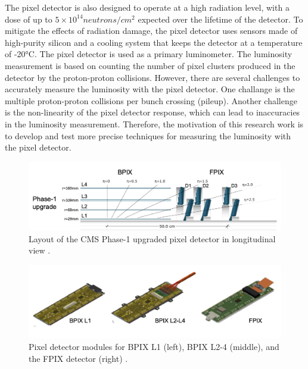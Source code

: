 The pixel detector is also designed to operate at a high radiation level, with a dose of up to $5 \times 10^{14} neutrons/cm^2$ expected over the lifetime of the detector. To mitigate the effects of radiation damage, the pixel detector uses sensors made of high-purity silicon and a cooling system that keeps the detector at a temperature of -20°C. The pixel detector is  used as a primary luminometer. The luminosity measurement is based on counting the number of pixel clusters produced in the detector by the proton-proton collisions.  However, there are several challenges to accurately measure the luminosity with the pixel detector. One challange is the multiple proton-proton collisions per bunch crossing (pileup). Another challenge is the non-linearity of the pixel detector response, which can lead to inaccuracies in the luminosity measurement. Therefore, the motivation of this research work is to develop and test more precise techniques for measuring the luminosity with the pixel detector.

\begin{figure}[!htp]
\centering
\includegraphics[width=1\textwidth]{ashish_thesis/phaseI_upgrade_pixel_detector.png}
\caption[Pixel Detector Layout]{%
   Layout of the CMS Phase-1 upgraded pixel detector in longitudinal view \cite{Adam:2748381}. 
}
\label{fig:phaseI_upgrade}
\end{figure}


\begin{figure}[!htp]
\centering
\includegraphics[width=1\textwidth]{ashish_thesis/silicon_pixel_module.png}
\caption[Pixel Module Design]{%
   Pixel detector modules for BPIX L1 (left), BPIX L2-4 (middle), and
the FPIX detector (right) \cite{Adam:2748381}. 
}
\label{fig:pixelmodule}
\end{figure}


